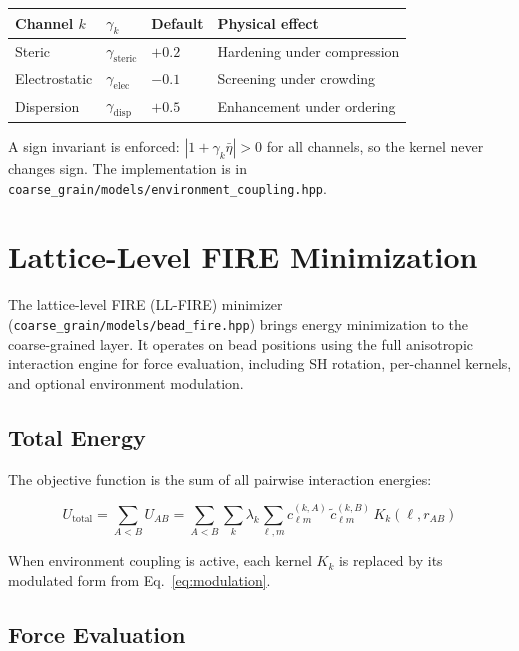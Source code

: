 ﻿\documentclass[11pt]{article}
\newcommand{\file}[1]{\texttt{#1}}
\begin{document}
\begin{center}
\begin{tabular}{llll}
\toprule
Channel $k$ & $\gamma_k$ & Default & Physical effect \\
\midrule
Steric        & $\gamma_{\mathrm{steric}}$ & $+0.2$ & Hardening under compression \\
Electrostatic & $\gamma_{\mathrm{elec}}$   & $-0.1$ & Screening under crowding \\
Dispersion    & $\gamma_{\mathrm{disp}}$   & $+0.5$ & Enhancement under ordering \\
\bottomrule
\end{tabular}
\end{center}

A sign invariant is enforced: $|1 + \gamma_k \bar{\eta}| > 0$ for all
channels, so the kernel never changes sign. The implementation is in
\file{coarse\_grain/models/environment\_coupling.hpp}.
\section{Lattice-Level FIRE Minimization}
\label{sec:fire}

The lattice-level FIRE (LL-FIRE) minimizer
(\file{coarse\_grain/models/bead\_fire.hpp}) brings energy minimization to
the coarse-grained layer. It operates on bead positions using the full
anisotropic interaction engine for force evaluation, including SH rotation,
per-channel kernels, and optional environment modulation.

\subsection{Total Energy}

The objective function is the sum of all pairwise interaction energies:

\begin{equation}
\label{eq:total-energy}
  U_{\mathrm{total}} = \sum_{A < B} U_{AB}
    = \sum_{A < B} \sum_{k} \lambda_k
      \sum_{\ell, m}
        c_{\ell m}^{(k,A)} \, \tilde{c}_{\ell m}^{(k,B)} \, K_k(\ell, r_{AB})
\end{equation}

When environment coupling is active, each kernel $K_k$ is replaced by its
modulated form from Eq.~\eqref{eq:modulation}.

\subsection{Force Evaluation}
\end{document}
